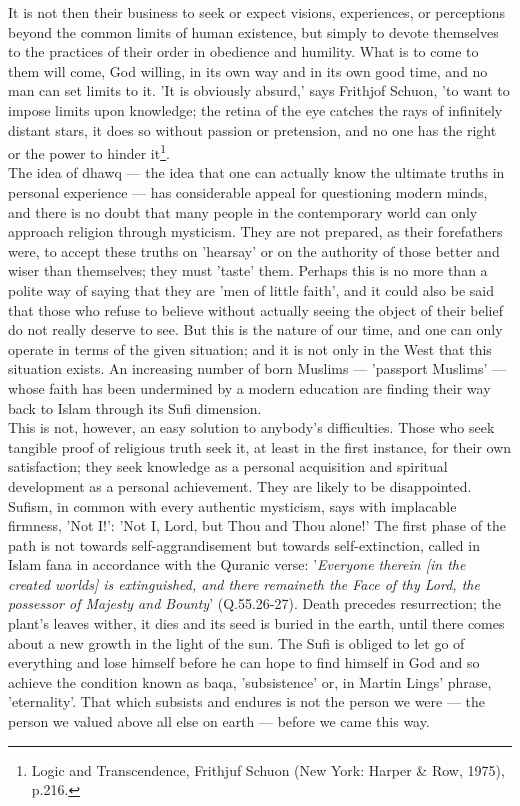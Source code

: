\documentclass[11pt, b5paper, twoside]{book}
\begin{document}
It is not then their business to seek or expect visions, experiences, or perceptions beyond the 
common limits of human existence, but simply to devote themselves to the practices of their order in 
obedience and humility. What is to come to them will come, God willing, in its own way and in its own 
good time, and no man can set limits to it. 'It is obviously absurd,' says Frithjof Schuon, 'to want 
to impose limits upon knowledge; the retina of the eye catches the rays of infinitely distant stars, 
it does so without passion or pretension, and no one has the right or the power to hinder it\footnote{Logic and Transcendence, Frithjuf Schuon (New York: Harper \& Row, 1975), p.216.}. \\

The idea of dhawq --- the idea that one can actually know the ultimate truths in personal experience --- 
has considerable appeal for questioning modern minds, and there is no doubt that many people in the 
contemporary world can only approach religion through mysticism. They are not prepared, as their 
forefathers were, to accept these truths on 'hearsay' or on the authority of those better and wiser 
than themselves; they must 'taste' them. Perhaps this is no more than a polite way of saying that 
they are 'men of little faith', and it could also be said that those who refuse to believe without 
actually seeing the object of their belief do not really deserve to see. But this is the nature of 
our time, and one can only operate in terms of the given situation; and it is not only in the West 
that this situation exists. An increasing number of born Muslims --- 'passport Muslims' --- whose faith 
has been undermined by a modern education are finding their way back to Islam through its Sufi 
dimension. \\

This is not, however, an easy solution to anybody's difficulties. Those who seek tangible proof of 
religious truth seek it, at least in the first instance, for their own satisfaction; they seek 
knowledge as a personal acquisition and spiritual development as a personal achievement. They are 
likely to be disappointed. Sufism, in common with every authentic mysticism, says with implacable 
firmness, 'Not I!': 'Not I, Lord, but Thou and Thou alone!' The first phase of the path is not 
towards self-aggrandisement but towards self-extinction, called in Islam fana in accordance with the 
Quranic verse: '\emph{Everyone therein [in the created worlds] is extinguished, and there remaineth the 
Face of thy Lord, the possessor of Majesty and Bounty}' (Q.55.26-27). Death precedes resurrection; the 
plant's leaves wither, it dies and its seed is buried in the earth, until there comes about a new 
growth in the light of the sun. The Sufi is obliged to let go of everything and lose himself before 
he can hope to find himself in God and so achieve the condition known as baqa, 'subsistence' or, in 
Martin Lings' phrase, 'eternality'. That which subsists and endures is not the person we were --- the 
person we valued above all else on earth --- before we came this way. \\
\end{document}
